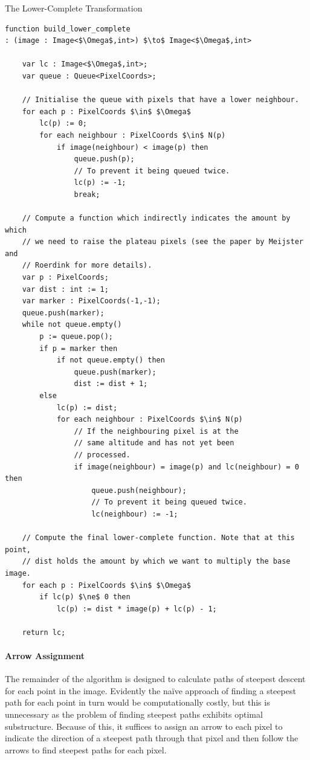 \begin{stulisting}[p]
\caption{The Lower-Complete Transformation}
\label{code:segmentation-watershed-lowercomplete}
\begin{lstlisting}[style=Default]
function build_lower_complete
: (image : Image<$\Omega$,int>) $\to$ Image<$\Omega$,int>

	var lc : Image<$\Omega$,int>;
	var queue : Queue<PixelCoords>;

	// Initialise the queue with pixels that have a lower neighbour.
	for each p : PixelCoords $\in$ $\Omega$
		lc(p) := 0;
		for each neighbour : PixelCoords $\in$ N(p)
			if image(neighbour) < image(p) then
				queue.push(p);
				// To prevent it being queued twice.
				lc(p) := -1;
				break;

	// Compute a function which indirectly indicates the amount by which
	// we need to raise the plateau pixels (see the paper by Meijster and
	// Roerdink for more details).
	var p : PixelCoords;
	var dist : int := 1;
	var marker : PixelCoords(-1,-1);
	queue.push(marker);
	while not queue.empty()
		p := queue.pop();
		if p = marker then
			if not queue.empty() then
				queue.push(marker);
				dist := dist + 1;
		else
			lc(p) := dist;
			for each neighbour : PixelCoords $\in$ N(p)
				// If the neighbouring pixel is at the
				// same altitude and has not yet been
				// processed.
				if image(neighbour) = image(p) and lc(neighbour) = 0 then
					queue.push(neighbour);
					// To prevent it being queued twice.
					lc(neighbour) := -1;
	
	// Compute the final lower-complete function. Note that at this point,
	// dist holds the amount by which we want to multiply the base image.
	for each p : PixelCoords $\in$ $\Omega$
		if lc(p) $\ne$ 0 then
			lc(p) := dist * image(p) + lc(p) - 1;

	return lc;
\end{lstlisting}
\end{stulisting}

\paragraph{Arrow Assignment}

The remainder of the algorithm is designed to calculate paths of steepest descent for each point in the image. Evidently the na\"ive approach of finding a steepest path for each point in turn would be computationally costly, but this is unnecessary as the problem of finding steepest paths exhibits optimal substructure. Because of this, it suffices to assign an arrow to each pixel to indicate the direction of a steepest path through that pixel and then follow the arrows to find steepest paths for each pixel.

